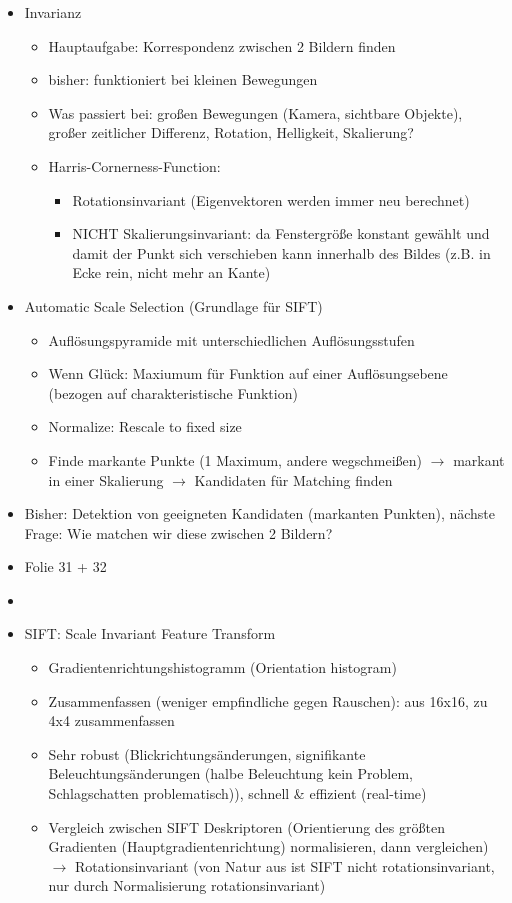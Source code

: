 \documentclass{report}
\begin{document}
\begin{itemize}
		\item Invarianz
		\begin{itemize}
			\item Hauptaufgabe: Korrespondenz zwischen 2 Bildern finden
			\item bisher: funktioniert bei kleinen Bewegungen
			\item Was passiert bei: großen Bewegungen (Kamera, sichtbare Objekte), großer zeitlicher Differenz, Rotation, Helligkeit, Skalierung?
			\item Harris-Cornerness-Function:
			\begin{itemize}
				\item Rotationsinvariant (Eigenvektoren werden immer neu berechnet)
				\item NICHT Skalierungsinvariant: da Fenstergröße konstant gewählt und damit der Punkt sich verschieben kann innerhalb des Bildes (z.B. in Ecke rein, nicht mehr an Kante)
				
			\end{itemize}
		\end{itemize}
	
		\item Automatic Scale Selection (Grundlage für SIFT)
		\begin{itemize}
			\item Auflösungspyramide mit unterschiedlichen Auflösungsstufen
			\item Wenn Glück: Maxiumum für Funktion auf einer Auflösungsebene (bezogen auf charakteristische Funktion)
			\item Normalize: Rescale to fixed size
			\item Finde markante Punkte (1 Maximum, andere wegschmeißen) $\rightarrow$ markant in einer Skalierung
			\newline $\rightarrow$ Kandidaten für Matching finden
		\end{itemize}
	
		\item Bisher: Detektion von geeigneten Kandidaten (markanten Punkten), nächste Frage: Wie matchen wir diese zwischen 2 Bildern?
		
		\item Folie 31 + 32
		\item 
		
		\item SIFT: Scale Invariant Feature Transform
		\begin{itemize}
			\item Gradientenrichtungshistogramm (Orientation histogram)
			\item Zusammenfassen (weniger empfindliche gegen Rauschen): aus 16x16, zu 4x4 zusammenfassen
			\item Sehr robust (Blickrichtungsänderungen, signifikante Beleuchtungsänderungen (halbe Beleuchtung kein Problem, Schlagschatten problematisch)), schnell \& effizient (real-time)
			\item Vergleich zwischen SIFT Deskriptoren (Orientierung des größten Gradienten (Hauptgradientenrichtung) normalisieren, dann vergleichen) $\rightarrow$ Rotationsinvariant (von Natur aus ist SIFT nicht rotationsinvariant, nur durch Normalisierung rotationsinvariant)
		\end{itemize}
	

\end{itemize}
\end{document}
